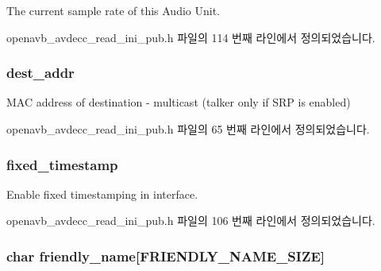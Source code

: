 The current sample rate of this Audio Unit. 



openavb\+\_\+avdecc\+\_\+read\+\_\+ini\+\_\+pub.\+h 파일의 114 번째 라인에서 정의되었습니다.

\subsubsection[{\texorpdfstring{dest\+\_\+addr}{dest_addr}}]{ dest\+\_\+addr}\hypertarget{structopenavb__tl__data__cfg_adafdd018fad617237267247e6680f87a}{}\label{structopenavb__tl__data__cfg_adafdd018fad617237267247e6680f87a}


M\+AC address of destination -\/ multicast (talker only if S\+RP is enabled) 



openavb\+\_\+avdecc\+\_\+read\+\_\+ini\+\_\+pub.\+h 파일의 65 번째 라인에서 정의되었습니다.

\subsubsection[{\texorpdfstring{fixed\+\_\+timestamp}{fixed_timestamp}}]{ fixed\+\_\+timestamp}\hypertarget{structopenavb__tl__data__cfg_a441ba8abc0d757aaefdb2680e09f19ac}{}\label{structopenavb__tl__data__cfg_a441ba8abc0d757aaefdb2680e09f19ac}


Enable fixed timestamping in interface. 



openavb\+\_\+avdecc\+\_\+read\+\_\+ini\+\_\+pub.\+h 파일의 106 번째 라인에서 정의되었습니다.

\subsubsection[{\texorpdfstring{friendly\+\_\+name}{friendly_name}}]{\setlength{\rightskip}{0pt plus 5cm}char friendly\+\_\+name\mbox{[}{\bf F\+R\+I\+E\+N\+D\+L\+Y\+\_\+\+N\+A\+M\+E\+\_\+\+S\+I\+ZE}\mbox{]}}\hypertarget{structopenavb__tl__data__cfg_a25c82ac188182d72242fb10f0285a2bd}{}\label{structopenavb__tl__data__cfg_a25c82ac188182d72242fb10f0285a2bd}


